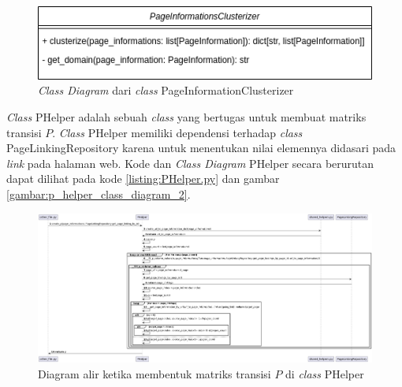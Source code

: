 \begin{figure}[H]
  \centering
  \includegraphics[keepaspectratio, width={\textwidth}]{gambar/page_information_clusterizer_class_diagram}
  \caption{\textit{Class Diagram} dari \textit{class} PageInformationClusterizer}
	\label{gambar:page_information_clusterizer_class_diagram}
\end{figure}

\textit{Class} PHelper adalah sebuah \textit{class} yang bertugas untuk membuat matriks transisi $P$. \textit{Class} PHelper memiliki dependensi terhadap \textit{class} PageLinkingRepository karena untuk menentukan nilai elemennya didasari pada \textit{link} pada halaman web. Kode dan \textit{Class Diagram} PHelper secara berurutan dapat dilihat pada kode \ref{listing:PHelper.py} dan gambar \ref{gambar:p_helper_class_diagram_2}.

\begin{figure}[H]
\centering
\includegraphics[width={\textheight}, height={\textwidth}, angle=270]{gambar/p_helper_sequence_diagram_2}
\caption{Diagram alir ketika membentuk matriks transisi $P$ di \textit{class} PHelper}
\label{gambar:p_helper_sequence_diagram_2}
\end{figure}


